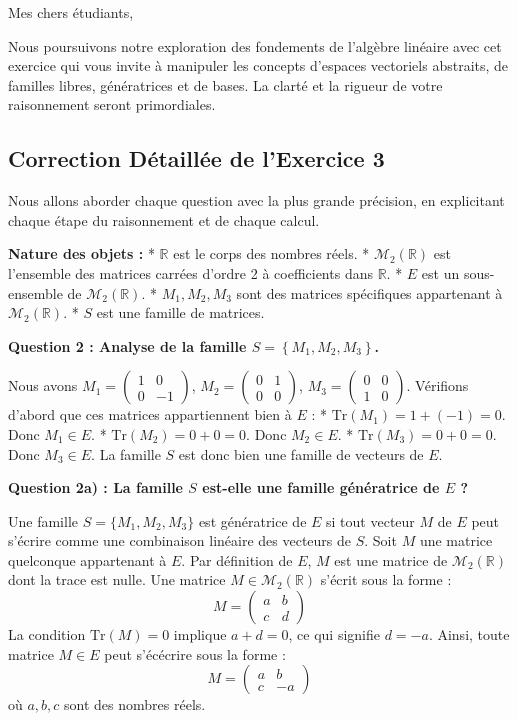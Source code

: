 \documentclass{report}
\begin{document}
\newpage


Mes chers étudiants,

Nous poursuivons notre exploration des fondements de l'algèbre linéaire avec cet exercice qui vous invite à manipuler les concepts d'espaces vectoriels abstraits, de familles libres, génératrices et de bases. La clarté et la rigueur de votre raisonnement seront primordiales.



\subsection*{Correction Détaillée de l'Exercice 3}

Nous allons aborder chaque question avec la plus grande précision, en explicitant chaque étape du raisonnement et de chaque calcul.

\textbf{Nature des objets :}
*   $\mathbb{R}$ est le corps des nombres réels.
*   $\mathcal{M}_2(\mathbb{R})$ est l'ensemble des matrices carrées d'ordre 2 à coefficients dans $\mathbb{R}$.
*   $E$ est un sous-ensemble de $\mathcal{M}_2(\mathbb{R})$.
*   $M_1, M_2, M_3$ sont des matrices spécifiques appartenant à $\mathcal{M}_2(\mathbb{R})$.
*   $S$ est une famille de matrices.



\textbf{Question 2 : Analyse de la famille $S = \left\{ M_1, M_2, M_3 \right\}$.}

Nous avons $M_1 = \begin{pmatrix} 1 & 0 \\ 0 & -1 \end{pmatrix}$, $M_2 = \begin{pmatrix} 0 & 1 \\ 0 & 0 \end{pmatrix}$, $M_3 = \begin{pmatrix} 0 & 0 \\ 1 & 0 \end{pmatrix}$.
Vérifions d'abord que ces matrices appartiennent bien à $E$ :
*   $\text{Tr}(M_1) = 1 + (-1) = 0$. Donc $M_1 \in E$.
*   $\text{Tr}(M_2) = 0 + 0 = 0$. Donc $M_2 \in E$.
*   $\text{Tr}(M_3) = 0 + 0 = 0$. Donc $M_3 \in E$.
La famille $S$ est donc bien une famille de vecteurs de $E$.

\textbf{Question 2a) : La famille $S$ est-elle une famille génératrice de $E$ ?}

Une famille $S = \{M_1, M_2, M_3\}$ est génératrice de $E$ si tout vecteur $M$ de $E$ peut s'écrire comme une combinaison linéaire des vecteurs de $S$.
Soit $M$ une matrice quelconque appartenant à $E$. Par définition de $E$, $M$ est une matrice de $\mathcal{M}_2(\mathbb{R})$ dont la trace est nulle.
Une matrice $M \in \mathcal{M}_2(\mathbb{R})$ s'écrit sous la forme :
$$M = \begin{pmatrix} a & b \\ c & d \end{pmatrix}$$
La condition $\text{Tr}(M) = 0$ implique $a+d=0$, ce qui signifie $d = -a$.
Ainsi, toute matrice $M \in E$ peut s'écécrire sous la forme :
$$M = \begin{pmatrix} a & b \\ c & -a \end{pmatrix}$$
où $a, b, c$ sont des nombres réels.
\end{document}
